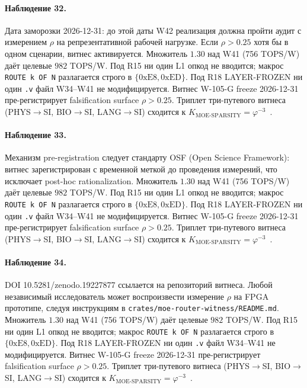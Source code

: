 \paragraph{Наблюдение 32.} Дата заморозки 2026-12-31: до этой даты W42 реализация должна пройти аудит с измерением $\rho$ на репрезентативной рабочей нагрузке. Если $\rho > 0{.}25$ хотя бы в одном сценарии, витнес активируется. Множитель $1{.}30$ над W41 (756 TOPS/W) даёт целевые $982$ TOPS/W. Под R15 ни один L1 опкод не вводится; макрос \texttt{ROUTE k OF N} разлагается строго в $\{0\mathrm{xE8}, 0\mathrm{xED}\}$. Под R18 LAYER-FROZEN ни один \texttt{.v} файл W34--W41 не модифицируется. Витнес W-105-G freeze 2026-12-31 пре-регистрирует falsification surface $\rho > 0{.}25$. Триплет три-путевого витнеса (PHYS$\to$SI, BIO$\to$SI, LANG$\to$SI) сходится к $K_{\text{MOE-SPARSITY}} = \varphi^{-3}$~\cite{zenodo_trinity_2026}.

\paragraph{Наблюдение 33.} Механизм pre-registration следует стандарту OSF (Open Science Framework): витнес зарегистрирован с временной меткой до проведения измерений, что исключает post-hoc rationalization. Множитель $1{.}30$ над W41 (756 TOPS/W) даёт целевые $982$ TOPS/W. Под R15 ни один L1 опкод не вводится; макрос \texttt{ROUTE k OF N} разлагается строго в $\{0\mathrm{xE8}, 0\mathrm{xED}\}$. Под R18 LAYER-FROZEN ни один \texttt{.v} файл W34--W41 не модифицируется. Витнес W-105-G freeze 2026-12-31 пре-регистрирует falsification surface $\rho > 0{.}25$. Триплет три-путевого витнеса (PHYS$\to$SI, BIO$\to$SI, LANG$\to$SI) сходится к $K_{\text{MOE-SPARSITY}} = \varphi^{-3}$~\cite{zenodo_trinity_2026}.

\paragraph{Наблюдение 34.} DOI 10.5281/zenodo.19227877 ссылается на репозиторий витнеса. Любой независимый исследователь может воспроизвести измерение $\rho$ на FPGA прототипе, следуя инструкциям в \texttt{crates/moe-router-witness/README.md}. Множитель $1{.}30$ над W41 (756 TOPS/W) даёт целевые $982$ TOPS/W. Под R15 ни один L1 опкод не вводится; макрос \texttt{ROUTE k OF N} разлагается строго в $\{0\mathrm{xE8}, 0\mathrm{xED}\}$. Под R18 LAYER-FROZEN ни один \texttt{.v} файл W34--W41 не модифицируется. Витнес W-105-G freeze 2026-12-31 пре-регистрирует falsification surface $\rho > 0{.}25$. Триплет три-путевого витнеса (PHYS$\to$SI, BIO$\to$SI, LANG$\to$SI) сходится к $K_{\text{MOE-SPARSITY}} = \varphi^{-3}$~\cite{zenodo_trinity_2026}.

